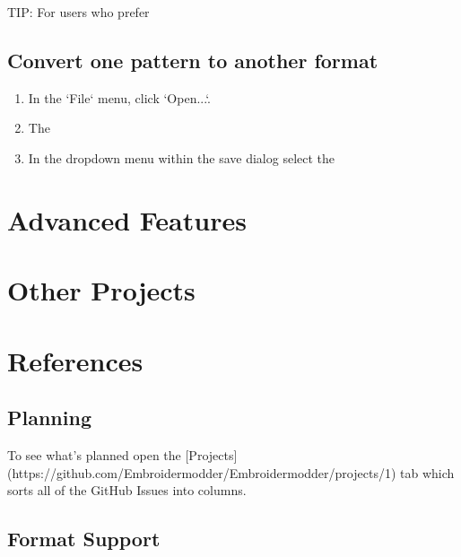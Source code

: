 \documentclass[a4paper, 11pt]{report}
\begin{document}
TIP: For users who prefer

\subsection{Convert one pattern to another format}

\begin{enumerate}
\item In the `File` menu, click `Open...`.
\item The 
\item In the dropdown menu within the save dialog select the 
\end{enumerate}

\section{Advanced Features}

\section{Other Projects}


\section{References}


\subsection{Planning}

To see what's planned open the [Projects](https://github.com/Embroidermodder/Embroidermodder/projects/1) tab which sorts all of the GitHub Issues into columns.

\subsection{Format Support}
\end{document}
